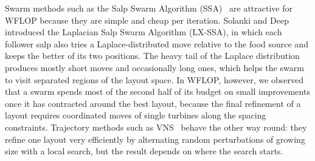 \documentclass[journal,twoside]{IEEEtran}
\begin{document}
Swarm methods such as the Salp Swarm Algorithm (SSA)~\cite{Mirjalili2017} are attractive for WFLOP because they are simple and cheap per iteration. Solanki and Deep~\cite{Solanki2023} introduced the Laplacian Salp Swarm Algorithm (LX-SSA), in which each follower salp also tries a Laplace-distributed move relative to the food source and keeps the better of its two positions. The heavy tail of the Laplace distribution produces mostly short moves and occasionally long ones, which helps the swarm to visit separated regions of the layout space. In WFLOP, however, we observed that a swarm spends most of the second half of its budget on small improvements once it has contracted around the best layout, because the final refinement of a layout requires coordinated moves of single turbines along the spacing constraints. Trajectory methods such as VNS~\cite{Mladenovic1997,Hansen2001} behave the other way round: they refine one layout very efficiently by alternating random perturbations of growing size with a local search, but the result depends on where the search starts.
\end{document}
